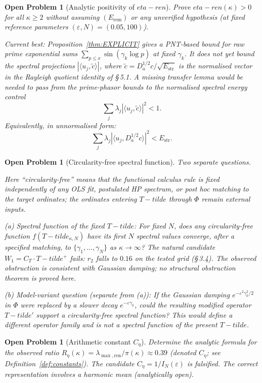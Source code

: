 \documentclass[11pt]{article}
\def\Tt{T-tilde}%
\def\etaren{eta-ren}%
\newtheorem{openproblem}[theorem]{Open Problem}
\newcommand{\Estr}{E_{\mathrm{str}}}
\newcommand{\etaren}{\eta_{\mathrm{ren}}}
\newcommand{\Tt}{\widetilde{T}}
\newcommand{\Ceta}{C_{\eta}}
\newcommand{\CT}{C_{T}}
\newcommand{\Wone}{W_1}
\newcommand{\Da}{D_a}
\begin{document}
\begin{openproblem}[Analytic positivity of $\etaren$]\label{op:pos}
Prove $\etaren(\kappa)>0$ for all $\kappa\ge 2$ without assuming
$(E_{\mathrm{rem}})$ or any unverified hypothesis
(at fixed reference parameters $(\varepsilon,N)=(0.05,100)$).

Current best: Proposition~\ref{thm:EXPLICIT} gives a PNT-based bound
for raw prime exponential sums $\sum_{p\le x}\sin(\gamma_k\log p)$
at fixed $\gamma_k$. It does not yet bound the spectral projections
$|\langle u_j,\tilde{c}\rangle|$, where $\tilde{c}=\Da^{1/2}c/\sqrt{\Estr}$
is the normalised vector in the Rayleigh quotient identity of \S\,5.1.
A missing transfer lemma would be needed to pass from the prime-phasor
bounds to the normalised spectral energy control
\[
\sum_j\lambda_j|\langle u_j,\tilde{c}\rangle|^2 < 1.
\]
Equivalently, in unnormalised form:
\[
\sum_j\lambda_j|\langle u_j,\Da^{1/2}c\rangle|^2 < \Estr.
\]
\end{openproblem}

\begin{openproblem}[Circularity-free spectral function]\label{op:hp}
Two separate questions.

Here ``circularity-free'' means that the functional calculus rule
is fixed independently of any OLS fit, postulated HP spectrum, or
post hoc matching to the target ordinates; the ordinates entering
$\Tt$ through $\Phi$ remain external inputs.

\emph{(a) Spectral function of the fixed $\Tt$:}
For fixed $N$, does any circularity-free function $f(\Tt_{\kappa,N})$
have its first $N$ spectral values converge, after a specified matching,
to $\{\gamma_1,\ldots,\gamma_N\}$ as $\kappa\to\infty$?
The natural candidate $\Wone = \CT\cdot\Tt^+$ fails: $r_2$ falls to $0.16$ on the tested grid
(\S\,3.4). The observed obstruction is consistent with Gaussian damping;
no structural obstruction theorem is proved here.

\emph{(b) Model-variant question (separate from (a)):}
If the Gaussian damping $e^{-\varepsilon^2\gamma_k^2/2}$ in $\Phi$ were
replaced by a slower decay $e^{-\varepsilon\gamma_k}$, could the
resulting modified operator $\Tt'$ support a circularity-free
spectral function? This would define a different operator family
and is not a spectral function of the present $\Tt$.
\end{openproblem}

\begin{openproblem}[Arithmetic constant $\Ceta$]\label{op:ceta}
Determine the analytic formula for the observed ratio
$R_\eta(\kappa)=\lambda_{\max,\mathrm{ren}}/\pi(\kappa)\approx 0.39$
(denoted $\Ceta$; see Definition~\ref{def:constants}).
The candidate $\Ceta = 1/I_N(\varepsilon)$ is falsified.
The correct representation involves a harmonic mean
(analytically open).
\end{openproblem}
\end{document}
